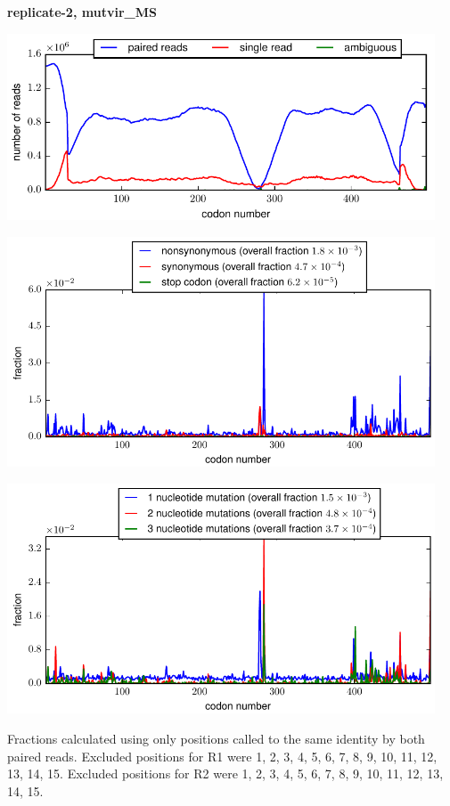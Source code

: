 \documentclass[10pt,letterpaper]{article}
\begin{document}
\centerline{\Large \bf replicate-2, mutvir\_MS}
\vspace{0.1in}

\centerline{\includegraphics[width=5in]{replicate-2-mutvir_MS_codondepth.pdf}}
\vspace{0.1in}

\centerline{\includegraphics[width=5in]{replicate-2-mutvir_MS_syn-ns-dist.pdf}}
\vspace{0.1in}

\centerline{\includegraphics[width=5in]{replicate-2-mutvir_MS_nmutspercodon-dist.pdf}}
\vspace{0.1in}

Fractions calculated using only positions called to the same identity by both paired reads.  Excluded positions for R1 were 1, 2, 3, 4, 5, 6, 7, 8, 9, 10, 11, 12, 13, 14, 15. 
 Excluded positions for R2 were 1, 2, 3, 4, 5, 6, 7, 8, 9, 10, 11, 12, 13, 14, 15. 
\end{document}
